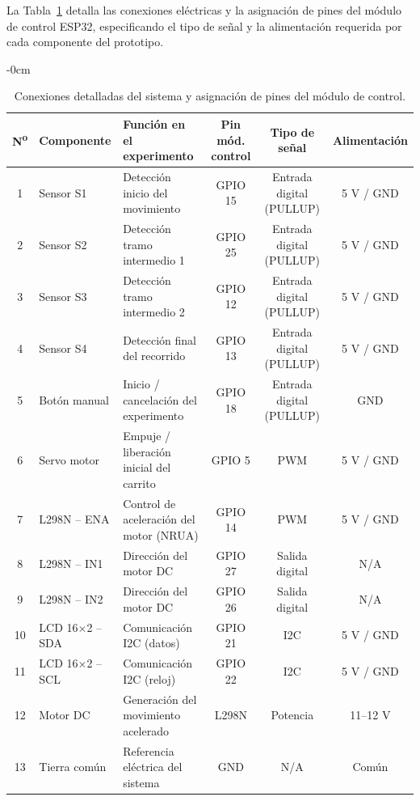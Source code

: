 \documentclass[journal,article,submit,pdftex]{Definitions/mdpi}
\begin{document}
La Tabla~\ref{tab:connections} detalla las conexiones el\'ectricas y la asignaci\'on de pines del m\'odulo de control ESP32, especificando el tipo de se\~nal y la alimentaci\'on requerida por cada componente del prototipo.

\begin{table}[H]
	\caption{Conexiones detalladas del sistema y asignaci\'on de pines del módulo de control.\label{tab:connections}}
	\small
	\begin{adjustwidth}{-\extralength}{0cm}
		\renewcommand{\arraystretch}{1.3}
		\renewcommand{\tabularxcolumn}[1]{m{#1}}
		\begin{tabularx}{\fulllength}{clXccc}
			\toprule
			\textbf{N\textsuperscript{o}} & \textbf{Componente} & \textbf{Funci\'on en el experimento} & \textbf{Pin m\'od. control} & \textbf{Tipo de se\~nal} & \textbf{Alimentaci\'on} \\
			\midrule
			1  & Sensor S1      & Detecci\'on inicio del movimiento         & GPIO 15 & Entrada digital (PULLUP) & 5 V / GND    \\
			2  & Sensor S2      & Detecci\'on tramo intermedio 1            & GPIO 25 & Entrada digital (PULLUP) & 5 V / GND    \\
			3  & Sensor S3      & Detecci\'on tramo intermedio 2            & GPIO 12 & Entrada digital (PULLUP) & 5 V / GND    \\
			4  & Sensor S4      & Detecci\'on final del recorrido           & GPIO 13 & Entrada digital (PULLUP) & 5 V / GND    \\
			5  & Bot\'on manual  & Inicio / cancelaci\'on del experimento    & GPIO 18 & Entrada digital (PULLUP) & GND          \\
			6  & Servo motor    & Empuje / liberaci\'on inicial del carrito & GPIO 5  & PWM                      & 5 V / GND    \\
			7  & L298N -- ENA   & Control de aceleraci\'on del motor (NRUA) & GPIO 14 & PWM                      & 5 V / GND    \\
			8  & L298N -- IN1   & Direcci\'on del motor DC                  & GPIO 27 & Salida digital           & N/A          \\
			9  & L298N -- IN2   & Direcci\'on del motor DC                  & GPIO 26 & Salida digital           & N/A          \\
			10 & LCD 16$\times$2 -- SDA & Comunicaci\'on I2C (datos)       & GPIO 21 & I2C                      & 5 V / GND    \\
			11 & LCD 16$\times$2 -- SCL & Comunicaci\'on I2C (reloj)       & GPIO 22 & I2C                      & 5 V / GND    \\
			12 & Motor DC       & Generaci\'on del movimiento acelerado     & L298N   & Potencia                 & 11--12 V     \\
			13 & Tierra com\'un  & Referencia el\'ectrica del sistema        & GND     & N/A                      & Com\'un       \\
			\bottomrule
		\end{tabularx}
	\end{adjustwidth}
\end{table}
\end{document}
